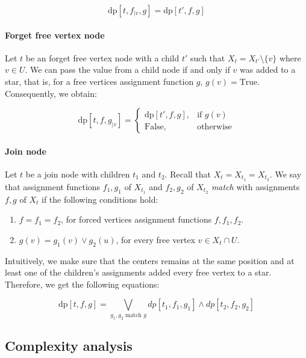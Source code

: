 \documentclass[en]{pracamgr}
\theoremstyle{definition}
\newcommand{\dpt}[1]{\textrm{dp}[#1]}
\newcommand{\true}{\textrm{True}}
\newcommand{\false}{\textrm{False}}
\begin{document}
\begin{equation*}
	\dpt{t,f_{|v},g} = \dpt{t',f,g}
\end{equation*}

\paragraph{Forget free vertex node} Let $t$ be an forget free vertex node with a child $t'$ such that $X_t = X_{t'} \setminus \{v\}$ where $v \in U$. We can pass the value from a child node if and only if $v$ was added to a star, that is, for a free vertices assignment function $g$, $g(v)=\true$. Consequently, we obtain:

\begin{equation*}
	\dpt{t,f,g_{|v}} =
	\begin{cases}
		\dpt{t',f,g}, & \text{if $g(v)$} \\
		\false, & \text{otherwise}
	\end{cases}
\end{equation*}

\paragraph{Join node} Let $t$ be a join node with children $t_1$ and $t_2$. Recall that $X_t=X_{t_1}=X_{t_2}$. We say that assignment functions $f_1,g_1$ of $X_{t_1}$ and $f_2,g_2$ of $X_{t_2}$ \textit{match} with assignments $f,g$ of $X_t$ if the following conditions hold:

\begin{enumerate}
	\item $f=f_1=f_2$, for forced vertices assignment functions $f,f_1,f_2$.
	\item $g(v)=g_1(v) \lor g_2(u)$, for every free vertex $v \in X_t \cap U$.
\end{enumerate}
Intuitively, we make sure that the centers remains at the same position and at least one of the children's assignments added every free vertex to a star. Therefore, we get the following equations:

\begin{equation*}
	\dpt{t,f,g} =
		\bigvee\limits_{g_1,g_2 \text{ match $g$}} dp[t_1,f_1,g_1] \land dp[t_2,f_2,g_2]
\end{equation*}

\subsection{Complexity analysis}
\end{document}
